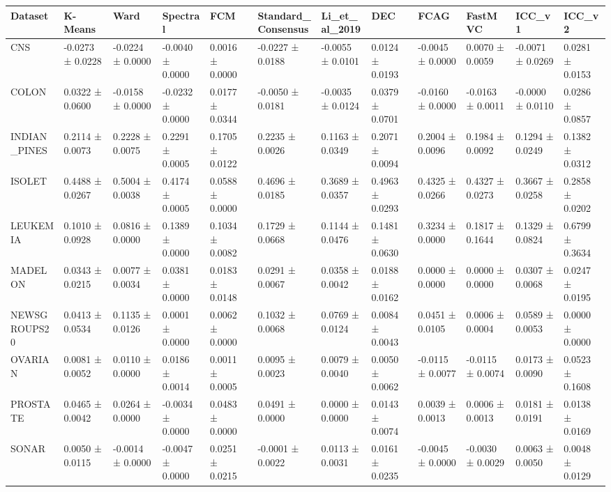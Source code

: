 \begin{tabular}{llllllllllll}
\toprule
Dataset & K-Means & Ward & Spectral & FCM & Standard_Consensus & Li_et_al_2019 & DEC & FCAG & FastMVC & ICC_v1 & ICC_v2 \\
\midrule
CNS & -0.0273 ± 0.0228 & -0.0224 ± 0.0000 & -0.0040 ± 0.0000 & 0.0016 ± 0.0000 & -0.0227 ± 0.0188 & -0.0055 ± 0.0101 & 0.0124 ± 0.0193 & -0.0045 ± 0.0000 & 0.0070 ± 0.0059 & -0.0071 ± 0.0269 & 0.0281 ± 0.0153 \\
COLON & 0.0322 ± 0.0600 & -0.0158 ± 0.0000 & -0.0232 ± 0.0000 & 0.0177 ± 0.0344 & -0.0050 ± 0.0181 & -0.0035 ± 0.0124 & 0.0379 ± 0.0701 & -0.0160 ± 0.0000 & -0.0163 ± 0.0011 & -0.0000 ± 0.0110 & 0.0286 ± 0.0857 \\
INDIAN_PINES & 0.2114 ± 0.0073 & 0.2228 ± 0.0075 & 0.2291 ± 0.0005 & 0.1705 ± 0.0122 & 0.2235 ± 0.0026 & 0.1163 ± 0.0349 & 0.2071 ± 0.0094 & 0.2004 ± 0.0096 & 0.1984 ± 0.0092 & 0.1294 ± 0.0249 & 0.1382 ± 0.0312 \\
ISOLET & 0.4488 ± 0.0267 & 0.5004 ± 0.0038 & 0.4174 ± 0.0005 & 0.0588 ± 0.0000 & 0.4696 ± 0.0185 & 0.3689 ± 0.0357 & 0.4963 ± 0.0293 & 0.4325 ± 0.0266 & 0.4327 ± 0.0273 & 0.3667 ± 0.0258 & 0.2858 ± 0.0202 \\
LEUKEMIA & 0.1010 ± 0.0928 & 0.0816 ± 0.0000 & 0.1389 ± 0.0000 & 0.1034 ± 0.0082 & 0.1729 ± 0.0668 & 0.1144 ± 0.0476 & 0.1481 ± 0.0630 & 0.3234 ± 0.0000 & 0.1817 ± 0.1644 & 0.1329 ± 0.0824 & 0.6799 ± 0.3634 \\
MADELON & 0.0343 ± 0.0215 & 0.0077 ± 0.0034 & 0.0381 ± 0.0000 & 0.0183 ± 0.0148 & 0.0291 ± 0.0067 & 0.0358 ± 0.0042 & 0.0188 ± 0.0162 & 0.0000 ± 0.0000 & 0.0000 ± 0.0000 & 0.0307 ± 0.0068 & 0.0247 ± 0.0195 \\
NEWSGROUPS20 & 0.0413 ± 0.0534 & 0.1135 ± 0.0126 & 0.0001 ± 0.0000 & 0.0062 ± 0.0000 & 0.1032 ± 0.0068 & 0.0769 ± 0.0124 & 0.0084 ± 0.0043 & 0.0451 ± 0.0105 & 0.0006 ± 0.0004 & 0.0589 ± 0.0053 & 0.0000 ± 0.0000 \\
OVARIAN & 0.0081 ± 0.0052 & 0.0110 ± 0.0000 & 0.0186 ± 0.0014 & 0.0011 ± 0.0005 & 0.0095 ± 0.0023 & 0.0079 ± 0.0040 & 0.0050 ± 0.0062 & -0.0115 ± 0.0077 & -0.0115 ± 0.0074 & 0.0173 ± 0.0090 & 0.0523 ± 0.1608 \\
PROSTATE & 0.0465 ± 0.0042 & 0.0264 ± 0.0000 & -0.0034 ± 0.0000 & 0.0483 ± 0.0000 & 0.0491 ± 0.0000 & 0.0000 ± 0.0000 & 0.0143 ± 0.0074 & 0.0039 ± 0.0013 & 0.0006 ± 0.0013 & 0.0181 ± 0.0191 & 0.0138 ± 0.0169 \\
SONAR & 0.0050 ± 0.0115 & -0.0014 ± 0.0000 & -0.0047 ± 0.0000 & 0.0251 ± 0.0215 & -0.0001 ± 0.0022 & 0.0113 ± 0.0031 & 0.0161 ± 0.0235 & -0.0045 ± 0.0000 & -0.0030 ± 0.0029 & 0.0063 ± 0.0050 & 0.0048 ± 0.0129 \\

\end{tabular}
